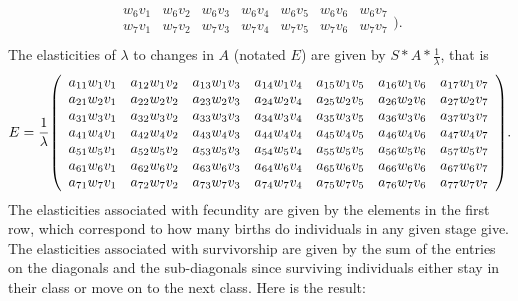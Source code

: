 \documentclass{article} %
\theoremstyle{plain}
\numberwithin{equation}{section} %
\numberwithin{figure}{section} %
\numberwithin{table}{section} %
\begin{document}
\begin{enumerate}[\ \ (a)]
\begin{align*}
\begin{array}{ccccccc}
                w_6v_1 & w_6v_2 & w_6v_3 & w_6v_4 & w_6v_5 & w_6v_6 & w_6v_7 \\
                w_7v_1 & w_7v_2 & w_7v_3 & w_7v_4 & w_7v_5 & w_7v_6 & w_7v_7 \\
            \end{array}).
        \end{align*}
        The elasticities of $\lambda$ to changes in $A$ (notated $E$) are given by $S*A*\frac{1}{\lambda}$, that is
        \begin{align*}
            E = \frac{1}{\lambda}\qty(\begin{array}{ccccccc}
                a_{11}w_1v_1 & a_{12}w_1v_2 & a_{13}w_1v_3 & a_{14}w_1v_4 & a_{15}w_1v_5 & a_{16}w_1v_6 & a_{17}w_1v_7 \\
                a_{21}w_2v_1 & a_{22}w_2v_2 & a_{23}w_2v_3 & a_{24}w_2v_4 & a_{25}w_2v_5 & a_{26}w_2v_6 & a_{27}w_2v_7 \\
                a_{31}w_3v_1 & a_{32}w_3v_2 & a_{33}w_3v_3 & a_{34}w_3v_4 & a_{35}w_3v_5 & a_{36}w_3v_6 & a_{37}w_3v_7 \\
                a_{41}w_4v_1 & a_{42}w_4v_2 & a_{43}w_4v_3 & a_{44}w_4v_4 & a_{45}w_4v_5 & a_{46}w_4v_6 & a_{47}w_4v_7 \\
                a_{51}w_5v_1 & a_{52}w_5v_2 & a_{53}w_5v_3 & a_{54}w_5v_4 & a_{55}w_5v_5 & a_{56}w_5v_6 & a_{57}w_5v_7 \\
                a_{61}w_6v_1 & a_{62}w_6v_2 & a_{63}w_6v_3 & a_{64}w_6v_4 & a_{65}w_6v_5 & a_{66}w_6v_6 & a_{67}w_6v_7 \\
                a_{71}w_7v_1 & a_{72}w_7v_2 & a_{73}w_7v_3 & a_{74}w_7v_4 & a_{75}w_7v_5 & a_{76}w_7v_6 & a_{77}w_7v_7 \\
            \end{array}).
        \end{align*}
        The elasticities associated with fecundity are given by the elements in the first row, which correspond to how many births do individuals in any given stage give.  The elasticities associated with survivorship are given by the sum of the entries on the diagonals and the sub-diagonals since surviving individuals either stay in their class or move on to the next class.  Here is the result:
        \begin{figure}[ht!]
            \centering

\end{figure}
\end{enumerate}
\end{document}
